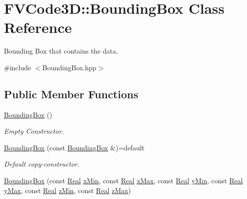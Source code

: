 \hypertarget{classFVCode3D_1_1BoundingBox}{}\section{F\+V\+Code3D\+:\+:Bounding\+Box Class Reference}
\label{classFVCode3D_1_1BoundingBox}


Bounding Box that contains the data.  




{\ttfamily \#include $<$Bounding\+Box.\+hpp$>$}

\subsection*{Public Member Functions}
\begin{DoxyCompactItemize}
\item 
\hyperlink{classFVCode3D_1_1BoundingBox_abebee23628c54bdb47d8f340941062a5}{Bounding\+Box} ()
\begin{DoxyCompactList}\small\item\em Empty Constructor. \end{DoxyCompactList}\item 
\hyperlink{classFVCode3D_1_1BoundingBox_a91c7c89f99d9b728997c41a40ed5c218}{Bounding\+Box} (const \hyperlink{classFVCode3D_1_1BoundingBox}{Bounding\+Box} \&)=default
\begin{DoxyCompactList}\small\item\em Default copy-\/constructor. \end{DoxyCompactList}\item 
\hyperlink{classFVCode3D_1_1BoundingBox_a7ac4368d37f0e9528edb161b43a20383}{Bounding\+Box} (const \hyperlink{namespaceFVCode3D_a40c1f5588a248569d80aa5f867080e83}{Real} \hyperlink{classFVCode3D_1_1BoundingBox_a8406e82493459d67f7c6e01c41401b01}{x\+Min}, const \hyperlink{namespaceFVCode3D_a40c1f5588a248569d80aa5f867080e83}{Real} \hyperlink{classFVCode3D_1_1BoundingBox_a0ba4fbfa989d212c7f9df6b5ee440ef2}{x\+Max}, const \hyperlink{namespaceFVCode3D_a40c1f5588a248569d80aa5f867080e83}{Real} \hyperlink{classFVCode3D_1_1BoundingBox_a8d241063de29672a73e478ccef500fcd}{y\+Min}, const \hyperlink{namespaceFVCode3D_a40c1f5588a248569d80aa5f867080e83}{Real} \hyperlink{classFVCode3D_1_1BoundingBox_abcec6a60efb3a0bd3333bba6cb8c5eb4}{y\+Max}, const \hyperlink{namespaceFVCode3D_a40c1f5588a248569d80aa5f867080e83}{Real} \hyperlink{classFVCode3D_1_1BoundingBox_a332192fde3727b7de1c9864e98659ac1}{z\+Min}, const \hyperlink{namespaceFVCode3D_a40c1f5588a248569d80aa5f867080e83}{Real} \hyperlink{classFVCode3D_1_1BoundingBox_a9b1fee0fe7324865743f4029dd06e1a3}{z\+Max})

\end{DoxyCompactItemize}
